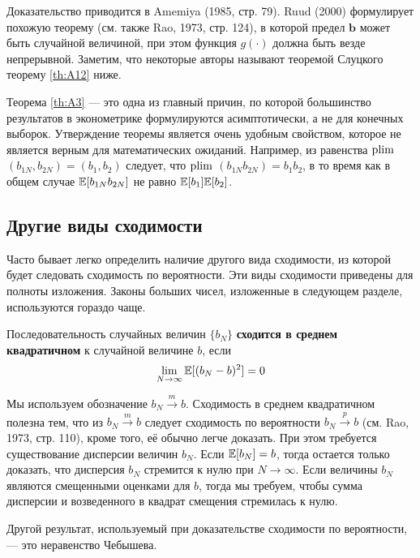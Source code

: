 Доказательство приводится в Amemiya (1985, стр. 79). Ruud (2000) формулирует похожую теорему (см. также Rao, 1973, стр. 124), в которой предел $\mathbf{b}$ может быть случайной величиной, при этом функция $g(\cdot)$ должна быть везде непрерывной. Заметим, что некоторые авторы называют теоремой Слуцкого теорему \ref{th:A12} ниже.

Теорема \ref{th:A3}  --- это одна из главный причин, по которой большинство результатов в эконометрике формулируются асимптотически, а не для конечных выборок. Утверждение теоремы является очень удобным свойством, которое не является верным для математических ожиданий. Например, из равенства $\mathrm{plim }$ $(b_{1N},b_{2N})=(b_1,b_2)$ следует, что $\mathrm{plim }$ $(b_{1N}b_{2N})=b_1b_2$, в то время как в общем случае $\mathbb{E}[b_{1N}b_{2N}]$ не равно $\mathbb{E}[b_{1}]\mathbb{E}[b_{2}]$.



\subsection{Другие виды сходимости}

Часто бывает легко определить наличие другого вида сходимости, из которой будет следовать сходимость по вероятности. Эти виды сходимости приведены для полноты изложения. Законы больших чисел, изложенные в следующем разделе, используются гораздо чаще.

\begin{definition} Последовательность случайных величин $\{b_N\}$  \textbf{сходится в среднем квадратичном} к случайной величине $b$, если 
\begin{equation}
\lim_{N\to\infty} \mathbb{E}[(b_N-b)^2] = 0
\end{equation}
\end{definition}

Мы используем обозначение $b_N \overset{m}{\to}b$. Сходимость в среднем квадратичном полезна тем, что из $b_N\overset{m}{\to} b$ следует сходимость по вероятности $b_N\overset{p}{\to}b$ (см. Rao, 1973, стр. 110), кроме того, её обычно легче доказать. При этом требуется существование дисперсии величин $b_N$. Если $\mathbb{E}[b_N]=b$, тогда остается только доказать, что дисперсия $b_N$ стремится к нулю при $N\to\infty$. Если величины $b_N$ являются смещенными оценками для $b$, тогда мы требуем, чтобы сумма дисперсии и возведенного в квадрат смещения стремилась к нулю.

Другой результат, используемый при доказательстве сходимости по вероятности, --- это неравенство Чебышева.

